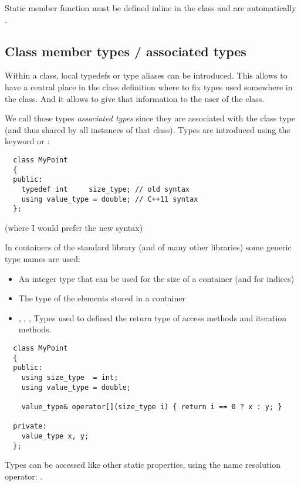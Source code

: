 Static member function must be defined inline in the class and are automatically .

\subsection{Class member types / associated types}
Within a class, local typedefs or type aliases can be introduced. This allows to have a central place in the class definition where to fix types used
somewhere in the class. And it allows to give that information to the user of the class.

We call those types \emph{associated types} since they are associated with the class type (and thus shared by all instances of that class). Types
are introduced using the keyword  or :
%
\begin{verbatim}
  class MyPoint
  {
  public:
    typedef int     size_type; // old syntax
    using value_type = double; // C++11 syntax
  };
\end{verbatim}
(where I would prefer the new syntax)

In containers of the standard library (and of many other libraries) some generic type names are used:
\begin{itemize}
  \item {} An integer type that can be used for the size of a container (and for indices)
  \item {} The type of the elements stored in a container
  \item {}, , ,  Types used to defined the return type of access methods and iteration methods.
\end{itemize}
%
\begin{verbatim}
  class MyPoint
  {
  public:
    using size_type  = int;
    using value_type = double;

    value_type& operator[](size_type i) { return i == 0 ? x : y; }

  private:
    value_type x, y;
  };
\end{verbatim}

Types can be accessed like other static properties, using the name resolution operator: .


